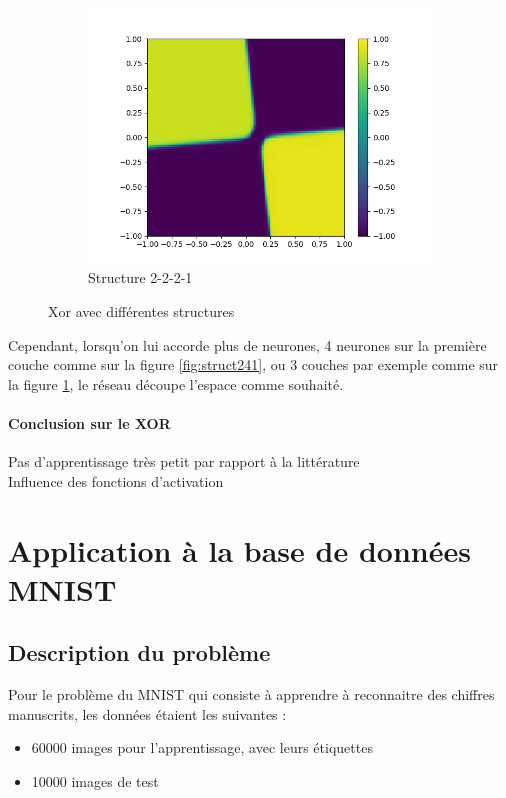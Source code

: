 \begin{figure}[h!]
\begin{subfigure}[b]{.3\linewidth}
    \includegraphics[width=\linewidth]{fig/xor2221_eta05.png}
    \caption{Structure 2-2-2-1}
    \label{fig:struct2221}
  \end{subfigure}
  \caption{Xor avec différentes structures}
  \label{structxor}
\end{figure}

Cependant, lorsqu'on lui accorde plus de neurones, 4 neurones sur la première couche comme sur la figure \ref{fig:struct241}, ou 3 couches par exemple comme sur la figure \ref{fig:struct2221}, le réseau découpe l'espace comme souhaité. 
	
\paragraph{Conclusion sur le XOR} %
\label{par:conclusion_sur_le_xor}
Pas d'apprentissage très petit par rapport à la littérature\\
Influence des fonctions d'activation

\section{Application à la base de données MNIST}

\subsection*{Description du problème} %

Pour le problème du MNIST qui consiste à apprendre à reconnaitre des chiffres manuscrits, les données étaient les suivantes : 
\begin{itemize}
	\item 60000 images pour l’apprentissage, avec leurs étiquettes
	\item 10000 images de test
\end{itemize}

